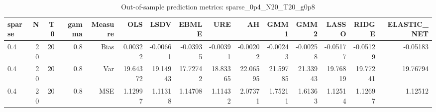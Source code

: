 \begin{table}[!htbp]\centering
\caption{Out-of-sample prediction metrics: sparse_0p4_N20_T20_g0p8}
\label{tab:table3_sparse_0p4_N20_T20_g0p8}
\begin{tabular}{lrrrrrrrrrrrrrr}
\hline
sparse & N & T0 & gamma & Measure & OLS & LSDV & EBMLE & URE & AH & GMM1 & GMM2 & LASSO & RIDGE & ELASTIC_NET \\
\hline
0.4 & 20 & 20 & 0.8 & Bias & 0.00322 & -0.00661 & -0.03935 & -0.00391 & -0.00202 & -0.00243 & -0.00258 & -0.05177 & -0.05129 & -0.05183 \\
0.4 & 20 & 20 & 0.8 & Var & 19.64372 & 19.14943 & 17.72742 & 18.83365 & 22.06595 & 21.59785 & 21.33943 & 19.76819 & 19.77241 & 19.76794 \\
0.4 & 20 & 20 & 0.8 & MSE & 1.12997 & 1.11318 & 1.14708 & 1.11432 & 2.07371 & 1.75211 & 1.61363 & 1.12514 & 1.12697 & 1.12512 \\
\hline
\end{tabular}
\end{table}

